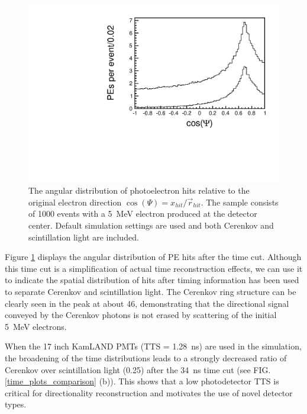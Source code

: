 \documentclass[aps,prc,twocolumn,groupedaddress,showpacs,amsmath,amssymb,floatfix,superscriptaddress]{revtex4}
\begin{document}
\begin{figure}
        \begin{center}
        \includegraphics[scale=0.40]{graphs/cos_psi_comp_h.pdf}
        \caption[]{The angular distribution of photoelectron hits
        relative to the original electron direction $\cos(\Psi) =
        x_{hit}/\vec{r}_{hit}$. The sample consists of 1000 events
        with a 5~MeV electron produced at the detector center. Default
        simulation settings are used and both Cerenkov and
        scintillation light are included. } 
        \label{cerenkov_cone}
        \end{center}
\end{figure}

Figure \ref{cerenkov_cone} displays the angular distribution of PE
hits after the time cut. Although this time cut is a simplification of actual time
reconstruction effects, we can use it to indicate the spatial
distribution of hits after timing information has been used to
separate Cerenkov and scintillation light. The Cerenkov ring structure
can be clearly seen in the peak at about 46\textdegree, demonstrating
that the directional signal conveyed by the Cerenkov photons is not
erased by scattering of the initial 5~MeV electrons.

When the 17 inch KamLAND PMTs \cite{tajimaMaster,kume_1983} (TTS =
1.28~ns) are used in the simulation, the broadening of the time
distributions leads to a strongly decreased ratio of Cerenkov over
scintillation light (0.25) after the 34~ns time cut (see
FIG. \ref{time_plots_comparison} (b)). This shows that a low
photodetector TTS is critical for directionality reconstruction and
motivates the use of novel detector types.
\end{document}
